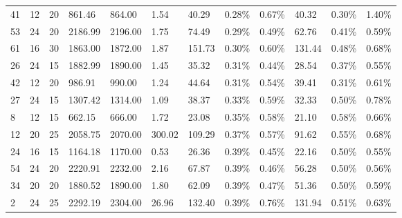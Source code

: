 \documentclass[../main]{subfiles}
\begin{document}
\begin{longtable}{l|ll|lll|lll|lll}
   41 & 12                         & 20                         & 861.46                    & 864.00   & 1.54                & 40.29  & 0.28\%  & 0.67\% & 40.32  & 0.30\%  & 1.40\% \\
   53 & 24                         & 20                         & 2186.99                   & 2196.00  & 1.75                & 74.49  & 0.29\%  & 0.49\% & 62.76  & 0.41\%  & 0.59\% \\
   61 & 16                         & 30                         & 1863.00                   & 1872.00  & 1.87                & 151.73 & 0.30\%  & 0.60\% & 131.44 & 0.48\%  & 0.68\% \\
   26 & 24                         & 15                         & 1882.99                   & 1890.00  & 1.45                & 35.32  & 0.31\%  & 0.44\% & 28.54  & 0.37\%  & 0.55\% \\
   42 & 12                         & 20                         & 986.91                    & 990.00   & 1.24                & 44.64  & 0.31\%  & 0.54\% & 39.41  & 0.31\%  & 0.61\% \\
   27 & 24                         & 15                         & 1307.42                   & 1314.00  & 1.09                & 38.37  & 0.33\%  & 0.59\% & 32.33  & 0.50\%  & 0.78\% \\
   8  & 12                         & 15                         & 662.15                    & 666.00   & 1.72                & 23.08  & 0.35\%  & 0.58\% & 21.10  & 0.58\%  & 0.66\% \\
   12 & 20                         & 25                         & 2058.75                   & 2070.00  & 300.02              & 109.29 & 0.37\%  & 0.57\% & 91.62  & 0.55\%  & 0.68\% \\
   24 & 16                         & 15                         & 1164.18                   & 1170.00  & 0.53                & 26.36  & 0.39\%  & 0.45\% & 22.16  & 0.50\%  & 0.55\% \\
   54 & 24                         & 20                         & 2220.91                   & 2232.00  & 2.16                & 67.87  & 0.39\%  & 0.46\% & 56.28  & 0.50\%  & 0.56\% \\
   34 & 20                         & 20                         & 1880.52                   & 1890.00  & 1.80                & 62.09  & 0.39\%  & 0.47\% & 51.36  & 0.50\%  & 0.59\% \\
   2  & 24                         & 25                         & 2292.19                   & 2304.00  & 26.96               & 132.40 & 0.39\%  & 0.76\% & 131.94 & 0.51\%  & 0.63\% \\

\end{longtable}
\end{document}

